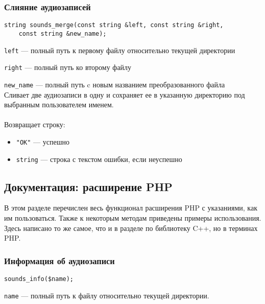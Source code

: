 \documentclass[14pt,a4paper]{article}
\begin{document}
\subsubsection*{Слияние аудиозаписей}

\begin{lstlisting}
string sounds_merge(const string &left, const string &right, 
	const string &new_name);
\end{lstlisting}

\lstinline{left} --- полный путь к первому файлу относительно текущей директории \par
\lstinline{right} --- полный путь ко второму файлу \par
\lstinline{new_name} --- полный путь c новым названием преобразованного файла \\

\noindent Сливает две аудиозаписи в одну и сохраняет ее в указанную директорию под выбранным пользователем именем. \\\\
Возвращает строку:
\smallskip
\begin{itemize}
\item \lstinline{"OK"} --- успешно
\item \lstinline{string} --- строка с текстом ошибки, если неуспешно
\end{itemize}

\subsection{Документация: расширение PHP}


В этом разделе перечислен весь функционал расширения PHP с указаниями, как им пользоваться. Также к некоторым методам приведены примеры использования. Здесь написано то же самое, что и в разделе по библиотеку C++, но в терминах PHP.

\subsubsection*{Информация об аудиозаписи}

\begin{lstlisting}
sounds_info($name);
\end{lstlisting}

\lstinline{name} --- полный путь к файлу относительно текущей директории. \\
\end{document}

